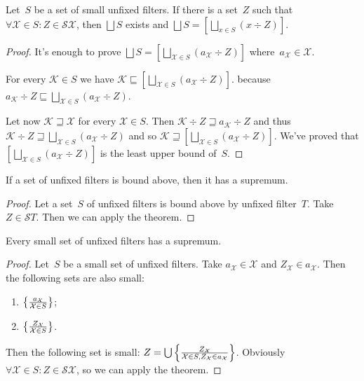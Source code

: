\begin{thm}
Let~$S$ be a set of small unfixed filters. If there is a
set~$Z$ such that
$\forall\mathcal{X}\in S:Z\in\mathscr{S}\mathcal{X}$, then
$\bigsqcup S$ exists and
$\bigsqcup S=\left[\bigsqcup_{x\in S}(x\div Z)\right]$.
\end{thm}

\begin{proof}
It's enough to prove $\bigsqcup S = \left[\bigsqcup_{\mathcal{X}\in S}(a_{\mathcal{X}}\div Z)\right]$ where~$a_{\mathcal{X}}\in\mathcal{X}$.

For every $\mathcal{K}\in S$ we have
$\mathcal{K} \sqsubseteq \left[\bigsqcup_{\mathcal{X}\in S}(a_{\mathcal{X}}\div Z)\right]$.
because 
$a_{\mathcal{K}}\div Z\sqsubseteq
\bigsqcup_{\mathcal{X}\in S}(a_{\mathcal{X}}\div Z)$.

Let now $\mathcal{K}\sqsupseteq\mathcal{X}$ for every
$\mathcal{X}\in S$. Then $\mathcal{K}\div Z\sqsupseteq
a_{\mathcal{K}}\div Z$ and thus
$\mathcal{K}\div Z\sqsupseteq
\bigsqcup_{\mathcal{X}\in S}(a_{\mathcal{X}}\div Z)$ and
so
$\mathcal{K} \sqsupseteq \left[\bigsqcup_{\mathcal{X}\in S}(a_{\mathcal{X}}\div Z)\right]$. We've proved that
$\left[\bigsqcup_{\mathcal{X}\in S}(a_{\mathcal{X}}\div Z)\right]$ is the least upper bound of~$S$.
\end{proof}

\begin{cor}
If a set of unfixed filters is bound above, then it has
a supremum.
\end{cor}

\begin{proof}
Let a set~$S$ of unfixed filters is bound above by unfixed
filter~$T$. Take $Z\in\mathscr{S}T$. Then we can apply
the theorem.
\end{proof}

\begin{cor}
Every small set of unfixed filters has a supremum.
\end{cor}

\begin{proof}
Let~$S$ be a small set of unfixed filters.
Take $a_{\mathcal{X}}\in\mathcal{X}$ and
$Z_{\mathcal{X}}\in a_{\mathcal{X}}$.
Then the following sets are also small:
\begin{enumerate}
\item $\left\{ \frac{a_\mathcal{X}}{\mathcal{X}\in S}\right\}$;
\item $\left\{ \frac{Z_\mathcal{X}}{\mathcal{X}\in S}\right\}$.
\end{enumerate}
Then the following set is small:
$Z=\bigcup\left\{ \frac{Z_\mathcal{X}}{\mathcal{X}\in S, Z_\mathcal{X}\in a_\mathcal{X}}\right\}$.
Obviously
$\forall\mathcal{X}\in S:Z\in\mathscr{S}\mathcal{X}$, so
we can apply the theorem.
\end{proof}


